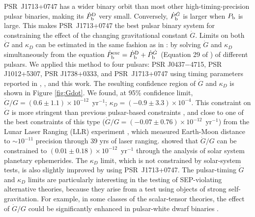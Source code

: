 PSR~J1713+0747 has a wider binary orbit than most other
high-timing-precision pulsar binaries, making its $\dot{P}_{\rm b}^{\rm D}$
very small. Conversely, $\dot{P}_{\rm b}^{\dot{G}}$ is larger when $P_{\rm b}$
is large. This makes PSR~J1713+0747 the best pulsar binary system for constraining
the effect of the changing gravitational constant $\dot{G}$. Limits 
on both $\dot{G}$ and $\kappa_D$ can be estimated in the same fashion as in
\citet{lwj+09}: by solving $\dot{G}$ and $\kappa_D$ simultaneously 
from the equation $\dot{P}_{\rm b}^{\rm exc} = \dot{P}_{\rm b}^{\rm D} +
\dot{P}_{\rm b}^{\dot{G}}$ (Equation 29 of \citealt{lwj+09}) of different
pulsars. We applied this method to four pulsars: PSR J0437$-$4715, PSR J1012+5307, PSR
J1738+0333, and PSR~J1713+0747 using timing parameters reported in
\citet{lwj+09}, \citet{fwe+12}, and this work.
The resulting confidence region of $\dot{G}$ and $\kappa_D$ is shown in Figure
\ref{fig:Gdot}.
We found, at 95\% confidence limit, $\dot{G}/G =
(0.6\pm1.1)\times10^{-12}$~yr$^{-1}$; $\kappa_D=(-0.9\pm3.3)\times10^{-4}$. 
This constraint on $\dot{G}$ is more stringent than
previous pulsar-based constraints \citep{fwe+12},
and close to one of the best constraints of this type
($\dot{G}/G=(-0.07\pm0.76)\times10^{-12}$~yr$^{-1}$) from the Lunar Laser Ranging
(LLR)
experiment \citep{hmb10}, which measured Earth-Moon distance to $\sim10^{-11}$
precision through 39 yrs of laser ranging.
\citet{fle+14} showed that $\dot{G}/G$ can be constrained to 
$(0.01\pm0.18)\times10^{-12}$~yr$^{-1}$ through the analysis of solar system planetary ephemerides.
The $\kappa_D$ limit, which is not constrained by solar-system tests, is also
slightly improved by using PSR~J1713+0747. 
The pulsar-timing $\dot{G}$ and $\kappa_D$ limits are particularly interesting 
in the testing of SEP-violating alternative theories, because they arise from 
a test using objects of strong self-gravitation. For example, in some classes of the 
scalar-tensor theories, the effect of $\dot{G}/G$ could be significantly enhanced 
in pulsar-white dwarf binaries \citep{wex14}.

